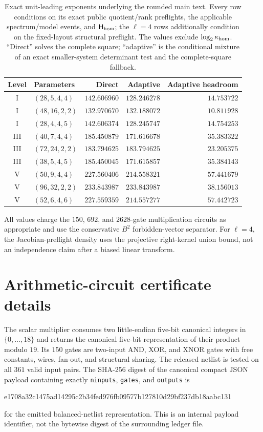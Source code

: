 \documentclass[11pt]{article}
\begin{document}
\begin{table}[H]
\centering
\caption{Exact unit-leading exponents underlying the rounded main text.  Every
row conditions on its exact public quotient/rank preflights, the applicable
spectrum/model events, and $\mathsf H_{\rm hom}$; the $\ell=4$ rows additionally
condition on the fixed-layout structural preflight.  The values exclude
$\log_2\kappa_{\rm hom}$.  ``Direct'' solves the complete square; ``adaptive''
is the conditional mixture of an exact smaller-system determinant test and the
complete-square fallback.}
\label{tab:exact-ledger}
\small
\begin{tabular}{@{}c l r r r@{}}
\toprule
Level & Parameters & Direct & Adaptive & Adaptive headroom\\
\midrule
I   & $(28,5,4,4)$  & $142.606960$ & $128.246278$ & $14.753722$\\
I   & $(48,16,2,2)$ & $132.970670$ & $132.188072$ & $10.811928$\\
I   & $(28,4,4,5)$  & $142.606374$ & $128.245747$ & $14.754253$\\
III & $(40,7,4,4)$  & $185.450879$ & $171.616678$ & $35.383322$\\
III & $(72,24,2,2)$ & $183.794625$ & $183.794625$ & $23.205375$\\
III & $(38,5,4,5)$  & $185.450045$ & $171.615857$ & $35.384143$\\
V   & $(50,9,4,4)$  & $227.560406$ & $214.558321$ & $57.441679$\\
V   & $(96,32,2,2)$ & $233.843987$ & $233.843987$ & $38.156013$\\
V   & $(52,6,4,6)$  & $227.559359$ & $214.557277$ & $57.442723$\\
\bottomrule
\end{tabular}
\end{table}

All values charge the $150$, $692$, and $2628$-gate multiplication circuits
as appropriate and use the conservative $B^2$ forbidden-vector separator.
For $\ell=4$, the Jacobian-preflight density uses the projective right-kernel
union bound, not an independence claim after a biased linear transform.

\section{Arithmetic-circuit certificate details}\label{app:circuits}
The scalar multiplier consumes two little-endian five-bit canonical integers
in $\{0,\ldots,18\}$ and returns the canonical five-bit representation of
their product modulo $19$.  Its $150$ gates are two-input AND, XOR, and XNOR
gates with free constants, wires, fan-out, and structural sharing.  The
released netlist is tested on all $361$ valid input pairs.  The SHA-256 digest
of the canonical compact JSON payload containing exactly
\texttt{ninputs}, \texttt{gates}, and \texttt{outputs} is
\begin{center}
\ttfamily\small
 e1708a32c1475ad14295c2b34fed976fb09577b127810d29bf237db18aabc131
\end{center}
for the emitted balanced-netlist representation.  This is an internal payload
identifier, not the bytewise digest of the surrounding ledger file.
\end{document}
